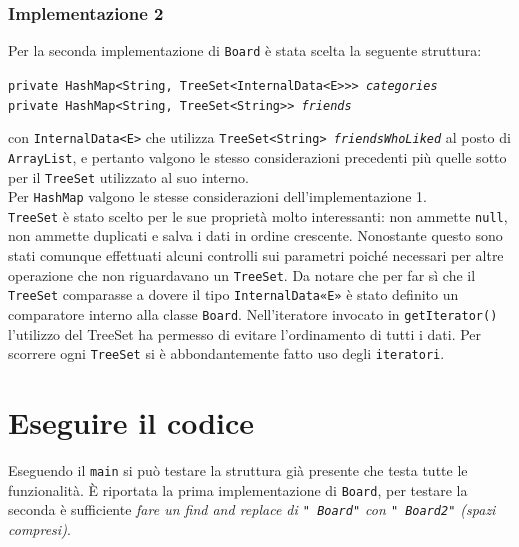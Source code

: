 \documentclass[10pt, a4paper]{article}
\begin{document}
\subsubsection{Implementazione 2}
Per la seconda implementazione di \texttt{Board} è stata scelta la seguente struttura: 
\begin{center}
\texttt{private HashMap<String, TreeSet<InternalData<E>>> \emph{categories}\\
	private HashMap<String, TreeSet<String>> \emph{friends}}
\end{center}
con \texttt{InternalData<E>} che utilizza \texttt{TreeSet<String> \emph{friendsWhoLiked}}
al posto di \texttt{ArrayList}, e pertanto valgono le stesso considerazioni precedenti più quelle sotto per il \texttt{TreeSet} utilizzato al suo interno.\\
Per \texttt{HashMap} valgono le stesse considerazioni dell'implementazione 1.\\
\texttt{TreeSet} è stato scelto per le sue proprietà molto interessanti: non ammette \texttt{null}, non ammette duplicati e salva i dati in ordine crescente. Nonostante questo sono stati comunque effettuati alcuni controlli sui parametri poiché necessari per altre operazione che non riguardavano un \texttt{TreeSet}.
Da notare che per far sì che il \texttt{TreeSet} comparasse a dovere il tipo \texttt{InternalData«E»} è stato definito un comparatore interno alla classe \texttt{Board}. Nell'iteratore invocato in \texttt{getIterator()} l'utilizzo del TreeSet ha permesso di evitare l'ordinamento di tutti i dati.
Per scorrere ogni \texttt{TreeSet} si è abbondantemente fatto uso degli \texttt{iteratori}.
\section{Eseguire il codice}
Eseguendo il \texttt{main} si può testare la struttura già presente che testa tutte le funzionalità.
È riportata la prima implementazione di \texttt{Board}, per testare la seconda è sufficiente \textsl{fare un find and replace di \texttt{" Board"} con \texttt{" Board2"} (spazi compresi)}.
\end{document}
